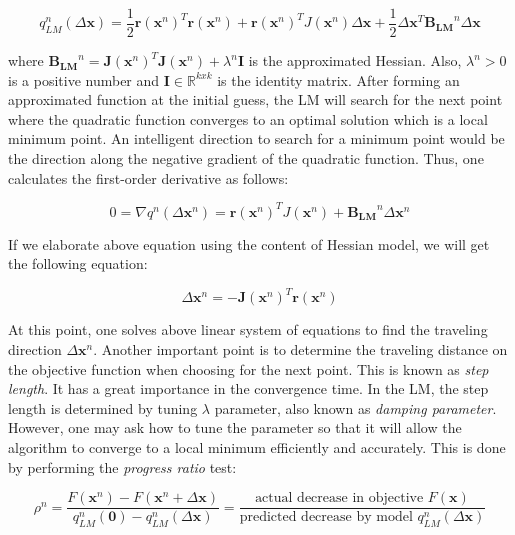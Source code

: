\documentclass[a4paper]{report}
\numberwithin{figure}{section}
\newcommand{\R}{\mathbb{R}}
\begin{document}
\begin{equation}
  q_{LM}^n(\Delta \mathbf{x}) = \frac{1}{2}\mathbf{r}(\mathbf{x}^n)^T\mathbf{r}(\mathbf{x}^n) + \mathbf{r}(\mathbf{x}^n)^TJ(\mathbf{x}^n)\Delta \mathbf{x} + \frac{1}{2}\Delta \mathbf{x}^T\mathbf{B_{LM}}^n\Delta \mathbf{x}
\end{equation}

where 
$
\mathbf{B_{LM}}^n = \mathbf{J}(\mathbf{x}^n)^T \mathbf{J}(\mathbf{x}^n) + \lambda^n \mathbf{I}
$ 
is the approximated Hessian. Also, 
$\lambda^n>0$ is a positive number and $\mathbf{I}\in \R^{kxk}$ is the identity matrix.
After forming an approximated function at the initial guess, the LM 
will search for the next point where the quadratic function converges to an  
optimal solution which is a local minimum point. An intelligent direction  
to search for a minimum point would be the direction along  
the negative gradient of the quadratic function. 
Thus, one calculates the first-order derivative as follows:

\begin{equation}\label{eq:lm_descent_direction}
  0 = 
  \nabla q^{n}(\Delta \mathbf{x}^n) = 
  \mathbf{r}(\mathbf{x}^n)^TJ(\mathbf{x}^n) + 
  \mathbf{B_{LM}}^n\Delta \mathbf{x}^n
\end{equation}


If we elaborate above equation using the content of Hessian model, 
we will get the following equation: 

\begin{equation}
  [\mathbf{J}(\mathbf{x}^n)^T\mathbf{J}(\mathbf{x}^n) + \lambda^n\mathbf{I}]\Delta \mathbf{x}^n = -\mathbf{J}(\mathbf{x}^n)^T\mathbf{r}(\mathbf{x}^n)
\end{equation}\label{eq:damping_full}

At this point, one solves above linear system of equations to find the traveling direction 
$\Delta \mathbf{x}^n$. Another important point is to determine the traveling 
distance on the objective function when choosing for the next point. This 
is known as \textit{step length}. It has a great importance in the 
convergence time. 
In the LM, the step length is determined by tuning $\lambda$ parameter, also known as 
\textit{damping parameter}. However, one may ask 
how to tune the parameter 
so that it will allow the algorithm to converge to a local minimum efficiently 
and accurately. This is done by performing the \textit{progress ratio} test:

\begin{equation}\label{eq:lm_progress_ratio}
  \rho^n = \frac{F(\mathbf{x}^n) - F(\mathbf{x}^n+\Delta \mathbf{x})}{q_{LM}^n(\mathbf{0})-q_{LM}^n(\Delta \mathbf{x})} =
  \frac{\text{actual decrease in objective } F(\mathbf{x})}
  {\text{predicted decrease by model } q_{LM}^n(\Delta \mathbf{\mathbf{x}})}
\end{equation}
\end{document}
